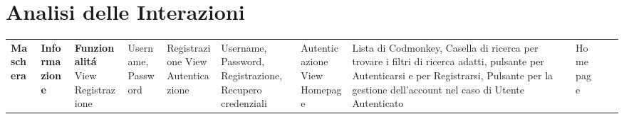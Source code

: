 \section{Analisi delle Interazioni}

\phantom{M}%

\begin{center}




    \begin{adjustwidth}{-1.9cm}{0cm}
        \begin{longtable}
            {|>{\raggedright}m{3.5cm}|>{\raggedright}m{7.5cm}|>{\raggedright}m{3cm}|}
            \hline
            \n      {}
            \large \centering\textbf{Maschera}                   & \centering\large\textbf{Informazione}                                                                                                                                                                                                                                                                                                                                                         & \large\textbf{Funzionalitá}
            \endhead
            \hline  View Registrazione                           & Username, Password                                                                                                                                                                                                                                                                                                                                                                            & Registrazione
            \n      View Autenticazione                          & Username, Password, Registrazione, Recupero credenziali                                                                                                                                                                                                                                                                                                                                       & Autenticazione
            \n      View Homepage                                & Lista di Codmonkey, Casella di ricerca per trovare i filtri di ricerca adatti, pulsante per Autenticarsi e per Registrarsi, Pulsante per la gestione dell'account nel caso di Utente Autenticato                                                                                                                                                                                              & Homepage

\end{longtable}
\end{adjustwidth}
\end{center}
